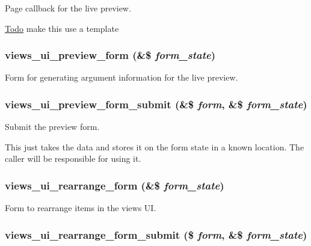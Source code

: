 Page callback for the live preview.

\begin{Desc}
\item[\hyperlink{todo__todo000007}{Todo}]make this use a template \end{Desc}
\hypertarget{admin_8inc_4fb153a5a54a26dd25b421020cbe538a}{
\subsubsection[{views\_\-ui\_\-preview\_\-form}]{\setlength{\rightskip}{0pt plus 5cm}views\_\-ui\_\-preview\_\-form (\&\$ {\em form\_\-state})}}
\label{admin_8inc_4fb153a5a54a26dd25b421020cbe538a}


Form for generating argument information for the live preview. \hypertarget{admin_8inc_ea5410d3cb0285a98e318812447befd3}{
\subsubsection[{views\_\-ui\_\-preview\_\-form\_\-submit}]{\setlength{\rightskip}{0pt plus 5cm}views\_\-ui\_\-preview\_\-form\_\-submit (\&\$ {\em form}, \/  \&\$ {\em form\_\-state})}}
\label{admin_8inc_ea5410d3cb0285a98e318812447befd3}


Submit the preview form.

This just takes the data and stores it on the form state in a known location. The caller will be responsible for using it. \hypertarget{admin_8inc_ed46401ae2bf055dc722299e6f041b9b}{
\subsubsection[{views\_\-ui\_\-rearrange\_\-form}]{\setlength{\rightskip}{0pt plus 5cm}views\_\-ui\_\-rearrange\_\-form (\&\$ {\em form\_\-state})}}
\label{admin_8inc_ed46401ae2bf055dc722299e6f041b9b}


Form to rearrange items in the views UI. \hypertarget{admin_8inc_6cc534f5a5904b1b21333fb063836be7}{
\subsubsection[{views\_\-ui\_\-rearrange\_\-form\_\-submit}]{\setlength{\rightskip}{0pt plus 5cm}views\_\-ui\_\-rearrange\_\-form\_\-submit (\$ {\em form}, \/  \&\$ {\em form\_\-state})}}
\label{admin_8inc_6cc534f5a5904b1b21333fb063836be7}


